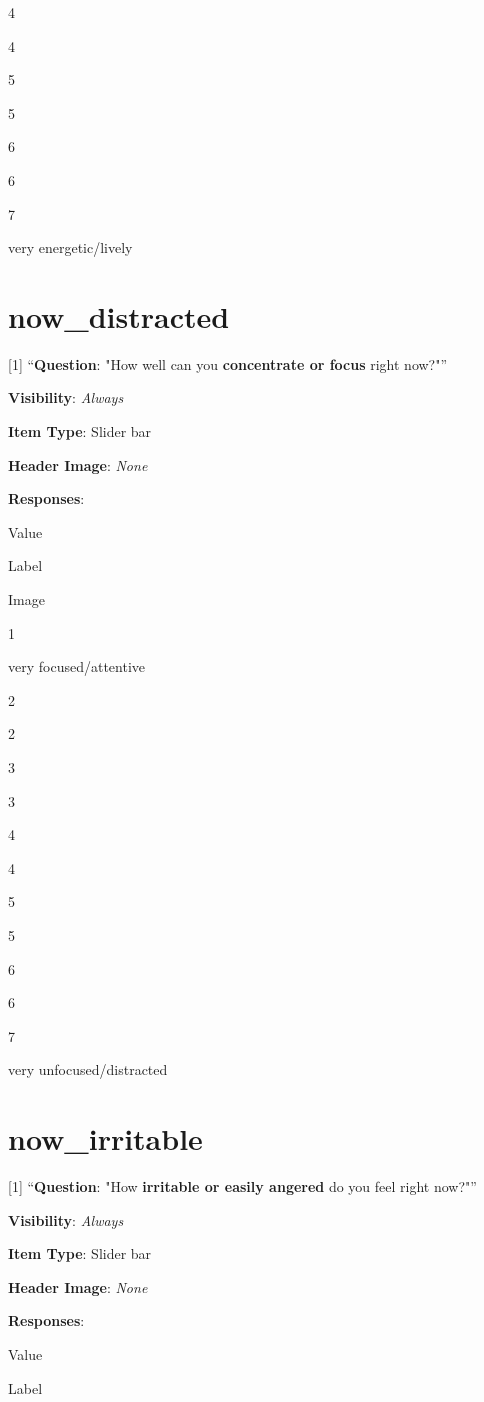 \documentclass[]{book}
\begin{document}
4

4

5

5

6

6

7

very energetic/lively

\hypertarget{now_distracted}{%
\section{now\_distracted}\label{now_distracted}}

{[}1{]} ``\textbf{Question}: "How well can you \textbf{concentrate or focus} right now?"''

\textbf{Visibility}: \emph{Always}

\textbf{Item Type}: Slider bar

\textbf{Header Image}: \emph{None}

\textbf{Responses}:

Value

Label

Image

1

very focused/attentive

2

2

3

3

4

4

5

5

6

6

7

very unfocused/distracted

\hypertarget{now_irritable}{%
\section{now\_irritable}\label{now_irritable}}

{[}1{]} ``\textbf{Question}: "How \textbf{irritable or easily angered} do you feel right now?"''

\textbf{Visibility}: \emph{Always}

\textbf{Item Type}: Slider bar

\textbf{Header Image}: \emph{None}

\textbf{Responses}:

Value

Label
\end{document}
